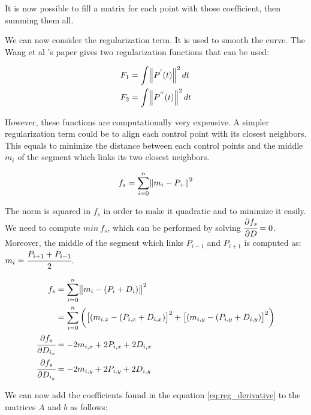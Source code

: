 \documentclass{article}
\newcommand{\vsp}{\vspace{\baselineskip}}
\begin{document}
It is now possible to fill a matrix for each point with those coefficient, then summing them all.

\vsp

We can now consider the regularization term. It is used to smooth the curve. The Wang et al 's paper \cite{SDM_bspline_fitting} gives two regularization functions that can be used:

\begin{equation}
    \begin{aligned}
        F_1 &= \int \norm{P^{'}(t)}^2 dt \\
        F_2 &= \int \norm{P^{''}(t)}^2 dt \\
    \end{aligned}    
\end{equation}

However, these functions are computationally very expensive. A simpler regularization term could be to align each control point with its closest neighbors. This equals to minimize the distance between each control points and the middle $m_i$ of the segment which links its two closest neighbors.

\begin{equation}
    f_s = \sum \limits_{i=0}^{n} \norm{m_i - P_+}^2
\end{equation}

The norm is squared in $f_s$ in order to make it quadratic and to minimize it easily. We need to compute $min\ f_s$, which can be performed by solving $\cfrac{\partial f_s}{\partial D} = 0$. Moreover, the middle of the segment which links $P_{i-1}$ and $P_{i+1}$ is computed as: $m_i = \cfrac{P_{i+1} + P_{i-1}}{2}$.

\begin{equation}
\label{eq:reg_derivative}
    \begin{aligned}
        f_s &= \sum \limits_{i=0}^{n} \norm{m_i - (P_i+D_i)}^2
        \\
            &= \sum \limits_{i=0}^{n} 
            \bigg( \big[ (m_{i,x} - (P_{i,x}+D_{i,x})\big]^2 
            + \big[ (m_{i,y} - (P_{i,y}+D_{i,y})\big]^2 \bigg)
        \\
        \cfrac{\partial f_s}{\partial D_{i_x}} &= -2 m_{i,x} + 2 P_{i,x} + 2 D_{i,x}
        \\
        \cfrac{\partial f_s}{\partial D_{i_y}} &= -2 m_{i,y} + 2 P_{i,y} + 2 D_{i,y}
    \end{aligned}
\end{equation}

We can now add the coefficients found in the equation \ref{eq:reg_derivative} to the matrices $A$ and $b$ as follows:
\end{document}
